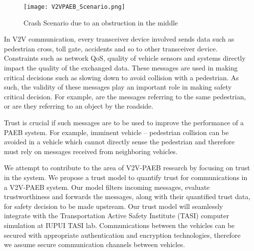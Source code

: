 \documentclass[conference]{IEEEtran}
\begin{document}
\begin{figure}[h]
\centering
\texttt{[image: V2VPAEB\_Scenario.png]}
\caption{Crash Scenario due to an obstruction in the middle}
\label{obstc}
\end{figure}

In V2V communication, every transceiver device involved sends data such as pedestrian cross, toll gate, accidents and so to other transceiver device. Constraints such as network QoS, quality of vehicle sensors and systems directly impact the quality of the exchanged data. These messages are used in making critical decisions such as slowing down to avoid collision with a pedestrian. As such, the validity of these messages play an important role in making safety critical decision. For example, are the messages referring to the same pedestrian, or are they referring to an object by the roadside.

Trust is crucial if such messages are to be used to improve the performance of a PAEB system. For example, imminent vehicle – pedestrian collision can be avoided in a vehicle which cannot directly sense the pedestrian and therefore must rely on messages received from neighboring vehicles.

We attempt to contribute to the area of V2V-PAEB research by focusing on trust in the system. We propose a trust model to quantify trust for communications in a V2V-PAEB system. Our model filters incoming messages, evaluate trustworthiness and forwards the messages, along with their quantified trust data, for safety decision to be made upstream. Our trust model will seamlessly integrate with the Transportation Active Safety Institute (TASI) computer simulation at IUPUI TASI lab. Communications between the vehicles can be secured with appropriate authentication and encryption technologies, therefore we assume secure communication channels between vehicles.
 
\end{document}

